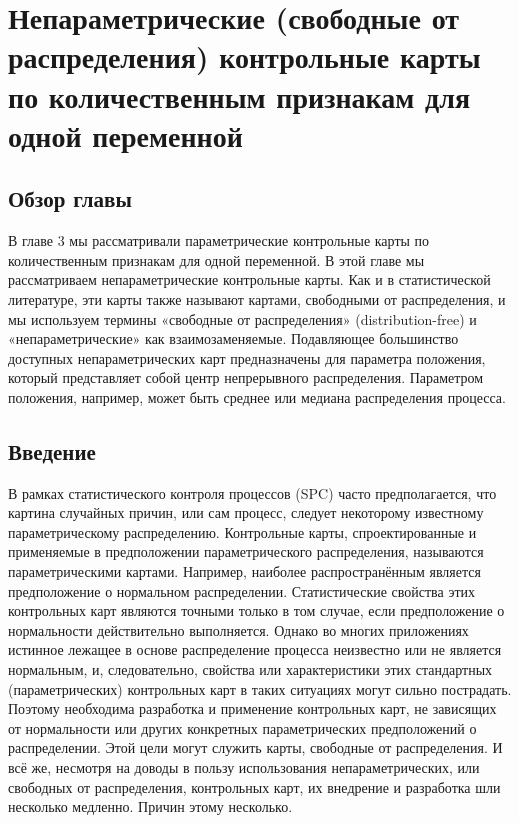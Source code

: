 \chapter{Непараметрические (свободные от распределения) контрольные карты по количественным признакам для одной переменной}

\section*{Обзор главы}
В главе 3 мы рассматривали параметрические контрольные карты по количественным признакам для одной переменной. В этой главе мы рассматриваем непараметрические контрольные карты. Как и в статистической литературе, эти карты также называют картами, свободными от распределения, и мы используем термины «свободные от распределения» (distribution-free) и «непараметрические» как взаимозаменяемые. Подавляющее большинство доступных непараметрических карт предназначены для параметра положения, который представляет собой центр непрерывного распределения. Параметром положения, например, может быть среднее или медиана распределения процесса.

\section{Введение}
В рамках статистического контроля процессов (SPC) часто предполагается, что картина случайных причин, или сам процесс, следует некоторому известному параметрическому распределению. Контрольные карты, спроектированные и применяемые в предположении параметрического распределения, называются параметрическими картами. Например, наиболее распространённым является предположение о нормальном распределении. Статистические свойства этих контрольных карт являются точными только в том случае, если предположение о нормальности действительно выполняется. Однако во многих приложениях истинное лежащее в основе распределение процесса неизвестно или не является нормальным, и, следовательно, свойства или характеристики этих стандартных (параметрических) контрольных карт в таких ситуациях могут сильно пострадать. Поэтому необходима разработка и применение контрольных карт, не зависящих от нормальности или других конкретных параметрических предположений о распределении. Этой цели могут служить карты, свободные от распределения. И всё же, несмотря на доводы в пользу использования непараметрических, или свободных от распределения, контрольных карт, их внедрение и разработка шли несколько медленно. Причин этому несколько.


